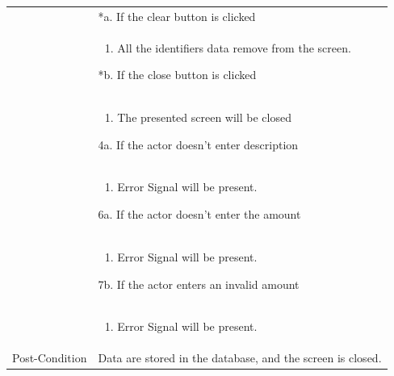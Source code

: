 \documentclass[12pt,a4paper]{article}
\begin{document}
\begin{longtable}{| p{3cm}|p{12cm}|}
& *a. If the clear button is clicked \\
& \begin{enumerate}
		\item All the identifiers data remove from the screen.
	\end{enumerate}
*b. If the close button is clicked\\
&	\begin{enumerate}
		\item The presented screen will be closed
	\end{enumerate}
4a. If the actor doesn't enter description \\ 	
&	\begin{enumerate}
		\item Error Signal will be present.
	\end{enumerate}
6a. If the actor doesn't enter the amount\\ 	
&	\begin{enumerate}
		\item Error Signal will be present.
	\end{enumerate}
7b. If the actor enters an invalid amount\\ 	
&	\begin{enumerate}
		\item Error Signal will be present.
	\end{enumerate}
\\ \hline
Post-Condition & Data are stored in the database, and the screen is closed.  \\\hline
\end{longtable}
\end{document}
